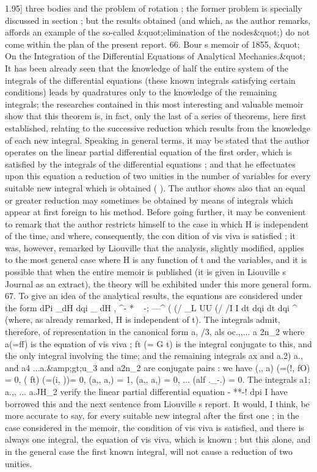 \documentclass[11pt,a4paper]{book}
\begin{document}
1.95]
three
bodies
and
the
problem
of
rotation
;
the
former
problem
is
specially
discussed
in
section
;
but
the
results
obtained
(and
which,
as
the
author
remarks,
affords an
example
of
the
so-called
\&quot;elimination
of
the
nodes\&quot;) do
not
come
within
the
plan
of
the present
report.
66.
Bour s memoir
of
1855,
\&quot; On
the
Integration
of
the
Differential
Equations
of
Analytical
Mechanics.\&quot;
It
has been already seen
that the knowledge
of
half
the
entire
system
of
the
integrals
of
the
differential
equations
(these known
integrals
satisfying
certain
conditions)
leads
by
quadratures
only
to
the
knowledge
of
the
remaining
integrals;
the
researches
contained
in
this
most
interesting and
valuable memoir show
that
this theorem
is,
in
fact,
only the
last
of a
series of theorems,
here
first
established,
relating
to
the
successive
reduction
which
results
from
the
knowledge
of
each new
integral.
Speaking
in
general
terms,
it may be
stated
that
the author
operates on the
linear partial
differential
equation
of
the
first
order, which
is
satisfied by
the
integrals
of
the
differential equations
;
and
that he
effectuates upon
this
equation
a
reduction
of
two
unities
in
the
number
of
variables
for
every
suitable
new
integral
which
is
obtained (
).
The
author
shows
also
that an
equal
or
greater reduction may sometimes
be
obtained by means
of
integrals which appear
at
first
foreign
to
his
method.
Before
going
further,
it may
be
convenient
to
remark
that
the
author
restricts
himself
to
the
case
in
which H
is
independent
of
the
time,
and
where,
consequently,
the
con
dition
of
vis viva
is
satisfied
;
it
was,
however, remarked by
Liouville that the
analysis,
slightly
modified,
applies
to
the
most
general
case where H
is
any
function
of
t and
the
variables, and
it
is
possible
that when
the
entire
memoir
is published
(it
is given
in
Liouville s
Journal
as
an
extract),
the
theory
will
be
exhibited
under
this
more
general
form.
67.
To
give an
idea
of
the
analytical
results,
the
equations
are
considered under
the
form
dPi _dH
dqi _
dH
,
^-
*
~
-;
---^
(
(/
_L
UU
(/
/I
I
dt
dqi
dt
dqi
^
(where,
as
already
remarked, H
is
independent
of
t).
The
integrals
admit,
therefore,
of representation
in the canonical form
a,
/3,
als
oc.,,...
a 2n_2 where a(=ff)
is the equation
of
vis
viva
;
ft (= G
t)
is the integral
conjugate
to
this, and the
only integral involving
the time; and the remaining integrals
ax and
a.2)
a., and
a4
...a.\&amp;gt;u_3 and a2n_2 are conjugate
pairs
:
we have
(,,
a) (=(!, fO) = 0,
(
ft) (=(i,
))=
0,
(a,,
a,) = 1,
(a,,
a,) = 0,
... (alf
._-.) = 0.
The
integrals
a1;
a.,, ...
a.JH_2 verify the
linear partial
differential equation
-
**-! \dqi
dpi
I
have
borrowed
this
and
the
next
sentence
from
Liouville s
report.
It
would,
I
think,
be
more
accurate
to
say,
for
every
suitable new
integral
after
the
first
one
;
in
the
case
considered
in
the
memoir,
the
condition
of
vis
viva
is
satisfied,
and
there
is
always
one
integral,
the
equation
of
vis
viva,
which
is
known
;
but
this alone, and in
the
general
case
the
first known
integral,
will
not
cause
a
reduction
of
two
unities.
\end{document}
